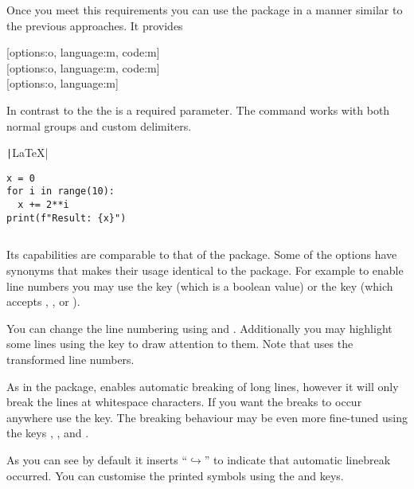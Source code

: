 Once you meet this requirements you can use the package in a manner similar to
the previous approaches. It provides
\begin{lscommand}
  [options:o, language:m, code:m] \\
  [options:o, language:m, code:m] \\
  [options:o, language:m]
\end{lscommand}
In contrast to the  the  is a required parameter.
The command  works with both normal groups and custom
delimiters.
\begin{example}[examplewidth=0.56\linewidth]
\texttt|\LaTeX{}|

\begin{verbatim}
x = 0
for i in range(10):
  x += 2**i
print(f"Result: {x}")
\end{verbatim}

\inputminted{rust}{age.rs}
\end{example}

Its capabilities are comparable to that of the  package. Some of
the options have synonyms that makes their usage identical to the
 package. For example to enable line numbers you may use the
 key (which is a boolean value) or the  key
(which accepts , ,  or ).
You can change the line numbering using  and
. Additionally you may highlight some lines using the
 key to draw attention to them. Note that
 uses the transformed line numbers.
\begin{chktexignore}
\end{chktexignore}

As in the  package,  enables automatic
breaking of long lines, however it will only break the lines at whitespace
characters. If you want the breaks to occur anywhere use the
 key. The breaking behaviour may be even more
fine-tuned using the keys , ,
 and .
As you can see by default it inserts \enquote{\(\hookrightarrow\)} to indicate
that automatic linebreak occurred. You can customise the printed symbols using
the  and  keys.

